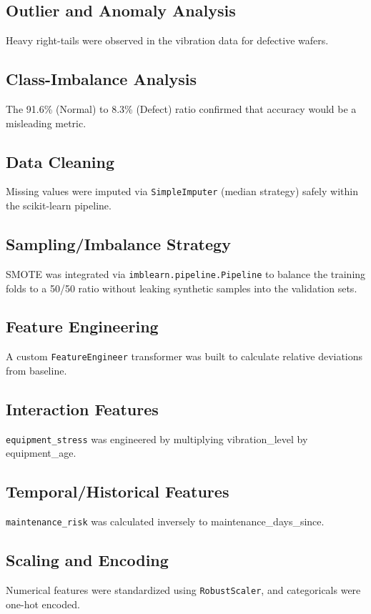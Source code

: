 \documentclass[12pt, a4paper]{article}
\begin{document}
\subsection{Outlier and Anomaly Analysis}
Heavy right-tails were observed in the vibration data for defective wafers.

\subsection{Class-Imbalance Analysis}
The 91.6\% (Normal) to 8.3\% (Defect) ratio confirmed that accuracy would be a misleading metric.

\subsection{Data Cleaning}
Missing values were imputed via \texttt{SimpleImputer} (median strategy) safely within the scikit-learn pipeline.

\subsection{Sampling/Imbalance Strategy}
SMOTE was integrated via \texttt{imblearn.pipeline.Pipeline} to balance the training folds to a 50/50 ratio without leaking synthetic samples into the validation sets.

\subsection{Feature Engineering}
A custom \texttt{FeatureEngineer} transformer was built to calculate relative deviations from baseline.

\subsection{Interaction Features}
\texttt{equipment\_stress} was engineered by multiplying vibration\_level by equipment\_age.

\subsection{Temporal/Historical Features}
\texttt{maintenance\_risk} was calculated inversely to maintenance\_days\_since.

\subsection{Scaling and Encoding}
Numerical features were standardized using \texttt{RobustScaler}, and categoricals were one-hot encoded.
\end{document}
